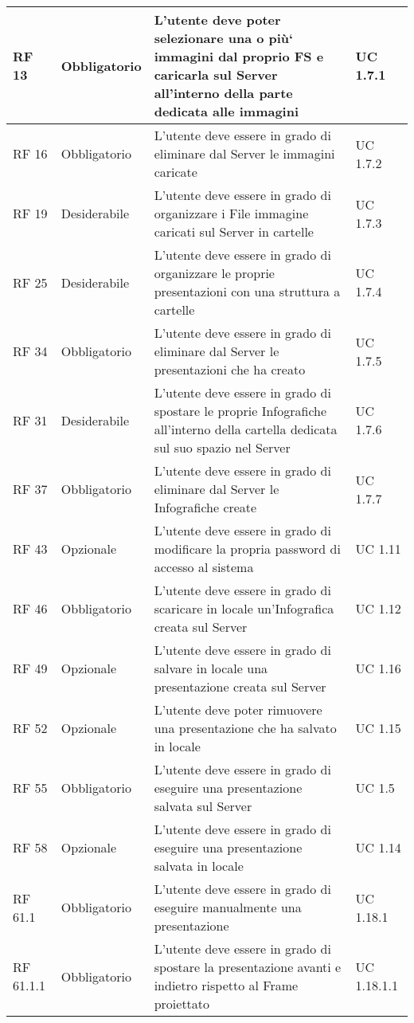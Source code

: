{\begin{longtable} [c]{| p{2.5cm} | p{2.5cm} | p{6cm} |p{2.5cm}|}
			\hline
			RF 13 & Obbligatorio & L’utente deve poter selezionare una o più` immagini dal proprio FS e caricarla sul Server\ped{g} all’interno della parte dedicata alle immagini & UC 1.7.1\\
			\hline
			RF 16 & Obbligatorio & L’utente deve essere in grado di eliminare dal Server\ped{g} le immagini caricate & UC 1.7.2\\			
			\hline
			RF 19 & Desiderabile & L'utente deve essere in grado di organizzare i File\ped{g} immagine caricati sul Server\ped{g} in cartelle & UC 1.7.3\\
			\hline
			RF 25 & Desiderabile & L'utente deve essere in grado di organizzare le proprie presentazioni con una struttura a cartelle & UC 1.7.4\\
			\hline
			RF 34 & Obbligatorio & L’utente deve essere in grado di eliminare dal Server\ped{g} le presentazioni che ha creato  & UC 1.7.5\\
			\hline
			RF 31 & Desiderabile & L'utente deve essere in grado di spostare le proprie Infografiche\ped{g} all’interno della cartella dedicata sul suo spazio nel Server\ped{g} & UC 1.7.6\\
			\hline
			RF 37 & Obbligatorio & L’utente deve essere in grado di eliminare dal Server\ped{g} le Infografiche\ped{g} create & UC 1.7.7\\
			\hline
			RF 43 & Opzionale & L'utente deve essere in grado di modificare la propria password di accesso al sistema & UC 1.11\\						
			\hline
			RF 46 & Obbligatorio & L'utente deve essere in grado di scaricare in locale un’Infografica\ped{g} creata sul Server\ped{g} & UC 1.12\\
			\hline
			RF 49 & Opzionale & L'utente deve essere in grado di salvare in locale una presentazione creata sul Server\ped{g} & UC 1.16\\
			\hline
			RF 52 & Opzionale & L’utente deve poter rimuovere una presentazione che ha salvato in locale & UC 1.15\\
			\hline
			RF 55 & Obbligatorio & L'utente deve essere in grado di eseguire una presentazione salvata sul Server\ped{g} & UC 1.5\\
			\hline
			RF 58 & Opzionale & L'utente deve essere in grado di eseguire una presentazione salvata in locale & UC 1.14\\
			\hline
			RF 61.1 & Obbligatorio & L'utente deve essere in grado di eseguire manualmente una presentazione & UC 1.18.1\\
			\hline
			RF 61.1.1 & Obbligatorio & L'utente deve essere in grado di spostare la presentazione avanti e indietro rispetto al Frame\ped{g} proiettato & UC 1.18.1.1\\

\end{longtable}}
